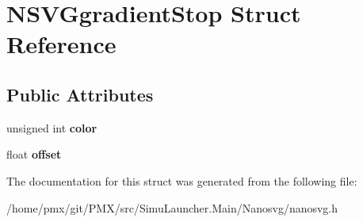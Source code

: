 \hypertarget{structNSVGgradientStop}{}\section{N\+S\+V\+Ggradient\+Stop Struct Reference}
\label{structNSVGgradientStop}
\subsection*{Public Attributes}
\begin{DoxyCompactItemize}
\item 
\mbox{\label{structNSVGgradientStop_ab27a56ac1f6bbf9e60d8b6247c1a9cc8}} 
unsigned int {\bfseries color}
\item 
\mbox{\label{structNSVGgradientStop_af6bb631bbcac76b8217595e3ad3ae979}} 
float {\bfseries offset}
\end{DoxyCompactItemize}


The documentation for this struct was generated from the following file\+:\begin{DoxyCompactItemize}
\item 
/home/pmx/git/\+P\+M\+X/src/\+Simu\+Launcher.\+Main/\+Nanosvg/nanosvg.\+h\end{DoxyCompactItemize}
